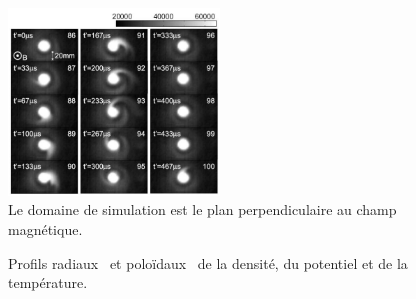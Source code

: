 \begin{refsection}
\begin{figure}[htbp]
\centering
\includegraphics[width=0.5\textwidth]{figures/4-CybeleNAGDIS.png}
{\caption{Le domaine de simulation est le plan perpendiculaire au champ
magnétique.}
\label{4-cybeleSimDomain}}
\end{figure}

\begin{figure}[htbp]
  \centering
    \caption{Profils radiaux~ et
    poloïdaux~ de la densité, du potentiel et de la
    température.}
    \label{4-CybeleProfils}
\end{figure}


\end{refsection}

